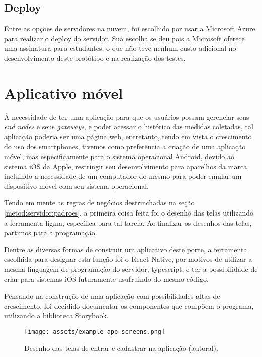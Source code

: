 \subsection{Deploy}
\label{metod:servidor:deploy}
Entre as opções de servidores na nuvem, foi escolhido por usar a Microsoft Azure para realizar o deploy do servidor. Sua escolha se deu pois a Microsoft oferece uma assinatura para estudantes, o que não teve nenhum custo adicional no desenvolvimento deste protótipo e na realização dos testes.

\section{Aplicativo móvel}
\label{metod:app}
À necessidade de ter uma aplicação para que os usuários possam gerenciar seus \textit{end nodes} e seus \textit{gateways}, e poder acessar o histórico das medidas coletadas, tal aplicação poderia ser uma página web, entretanto, tendo em vista o crescimento do uso dos smartphones, tivemos como preferência a criação de uma aplicação móvel, mas especificamente para o sistema operacional Android, devido ao sistema iOS da Apple, restringir seu desenvolvimento para aparelhos da marca, incluindo a necessidade de um computador do mesmo para poder emular um dispositivo móvel com seu sistema operacional.

Tendo em mente as regras de negócios destrinchadas na seção \ref{metod:servidor:padroes}, a primeira coisa feita foi o desenho das telas utilizando a ferramenta figma, específica para tal tarefa. Ao finalizar os desenhos das telas, partimos para a programação.

Dentre as diversas formas de construir um aplicativo deste porte, a ferramenta escolhida para designar esta função foi o React Native, por motivos de utilizar a mesma linguagem de programação do servidor, typescript, e ter a possibilidade de criar para sistemas iOS futuramente usufruindo do mesmo código.

Pensando na construção de uma aplicação com possibilidades altas de crescimento, foi decidido documentar os componentes que compõem o programa, utilizando a biblioteca Storybook.

\begin{figure}[H]
  \centering
  \texttt{[image: assets/example-app-screens.png]} 
  \caption{Desenho das telas de entrar e cadastrar na aplicação (autoral).}
  \label{fig:app-screns-login} 
\end{figure}